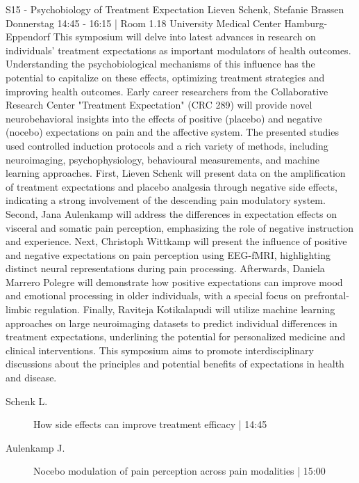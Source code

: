 
            \begin{symposium}
            {S15 - Psychobiology of Treatment Expectation }
            { Lieven Schenk, Stefanie Brassen}
            {Donnerstag 14:45 - 16:15 | Room 1.18}
            {University Medical Center Hamburg-Eppendorf}
            This symposium will delve into latest advances in research on individuals’ treatment expectations as important modulators of health outcomes. Understanding the psychobiological mechanisms of this influence has the potential to capitalize on these effects, optimizing treatment strategies and improving health outcomes. Early career researchers from the Collaborative Research Center "Treatment Expectation" (CRC 289) will provide novel neurobehavioral insights into the effects of positive (placebo) and negative (nocebo) expectations on pain and the affective system. The presented studies used controlled induction protocols and a rich variety of methods, including neuroimaging, psychophysiology, behavioural measurements, and machine learning approaches.
First, Lieven Schenk will present data on the amplification of treatment expectations and placebo analgesia through negative side effects, indicating a strong involvement of the descending pain modulatory system. Second, Jana Aulenkamp will address the differences in expectation effects on visceral and somatic pain perception, emphasizing the role of negative instruction and experience. Next, Christoph Wittkamp will present the influence of positive and negative expectations on pain perception using EEG-fMRI, highlighting distinct neural representations during pain processing. Afterwards, Daniela Marrero Polegre will demonstrate how positive expectations can improve mood and emotional processing in older individuals, with a special focus on prefrontal-limbic regulation. Finally, Raviteja Kotikalapudi will utilize machine learning approaches on large neuroimaging datasets to predict individual differences in treatment expectations, underlining the potential for personalized medicine and clinical interventions.
This symposium aims to promote interdisciplinary discussions about the principles and potential benefits of expectations in health and disease.
            \begin{description}    
            
                \item [ Schenk L.] How side effects can improve treatment efficacy \textcolor{mygray}{ | 14:45}    
                
                \item [ Aulenkamp J.] Nocebo modulation of pain perception across pain modalities \textcolor{mygray}{ | 15:00}    
                

\end{description}
\end{symposium}
